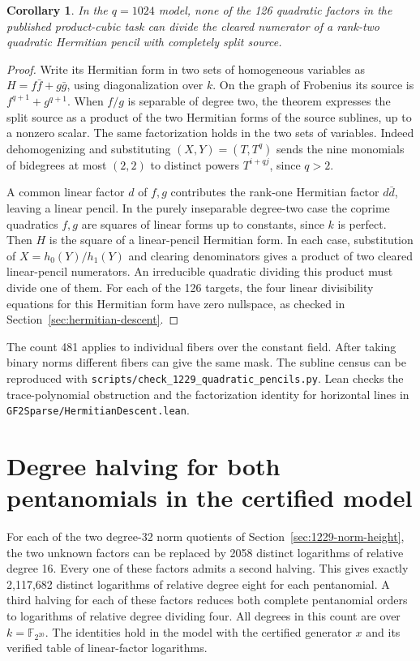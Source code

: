 \documentclass[11pt]{article}
\newtheorem{corollary}[theorem]{Corollary}
\begin{document}
\begin{corollary}
In the \(q=1024\) model, none of the 126 quadratic factors in the
published product-cubic task can divide the cleared numerator of a
rank-two quadratic Hermitian pencil with completely split source.
\end{corollary}

\begin{proof}
Write its Hermitian form in two sets of homogeneous variables as
\(H=f\bar f+g\bar g\), using diagonalization over \(k\).
On the graph of Frobenius its source is \(f^{q+1}+g^{q+1}\).
When \(f/g\) is separable of degree two, the theorem expresses the
split source as a product of the two Hermitian forms of the source
sublines, up to a nonzero scalar. The same factorization holds in the
two sets of variables. Indeed dehomogenizing and substituting
\((X,Y)=(T,T^q)\) sends the nine monomials of bidegrees at most
\((2,2)\) to distinct powers \(T^{i+qj}\), since \(q>2\).

A common linear factor \(d\) of \(f,g\) contributes the rank-one
Hermitian factor \(d\bar d\), leaving a linear pencil. In the
purely inseparable degree-two case the coprime quadratics \(f,g\)
are squares of linear forms up to constants, since \(k\) is perfect.
Then \(H\) is the square of a linear-pencil Hermitian form.
In each case, substitution of \(X=h_0(Y)/h_1(Y)\) and clearing
denominators gives a product of two cleared linear-pencil
numerators. An irreducible quadratic dividing this product must
divide one of them. For each of the 126 targets, the four linear
divisibility equations for this Hermitian form have zero nullspace,
as checked in Section~\ref{sec:hermitian-descent}.
\end{proof}

The count 481 applies to individual fibers over the constant field.
After taking binary norms different fibers can give the same mask.
The subline census can be reproduced with
\nolinkurl{scripts/check_1229_quadratic_pencils.py}.
Lean checks the trace-polynomial obstruction and the factorization
identity for horizontal lines in \nolinkurl{GF2Sparse/HermitianDescent.lean}.

\section{Degree halving for both pentanomials in the certified model}
\label{sec:dyadic-1229}
For each of the two degree-32 norm quotients of
Section~\ref{sec:1229-norm-height}, the two unknown factors can be
replaced by 2058 distinct logarithms of relative degree 16. Every one
of these factors admits a second halving. This gives exactly
2,117,682 distinct logarithms of relative degree eight for each
pentanomial. A third halving for each of these factors reduces both
complete pentanomial orders to logarithms of relative degree dividing
four. All degrees in this count are over \(k=\mathbb F_{2^{20}}\).
The identities hold in the model with the certified generator \(x\) and
its verified table of linear-factor logarithms.
\end{document}
